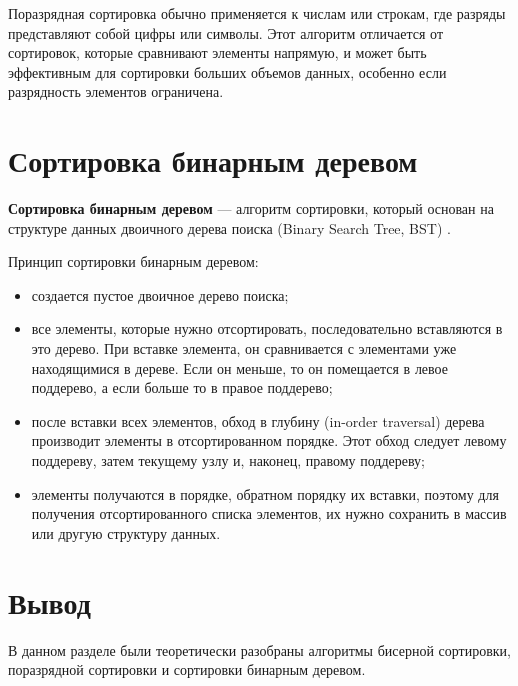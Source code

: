 Поразрядная сортировка обычно применяется к числам или строкам, где разряды представляют собой цифры или символы. Этот алгоритм отличается от сортировок, которые сравнивают элементы напрямую, и может быть эффективным для сортировки больших объемов данных, особенно если разрядность элементов ограничена.

\section{Сортировка бинарным деревом}
\textbf{Сортировка бинарным деревом} --- алгоритм сортировки, который основан на структуре данных двоичного дерева поиска (Binary Search Tree, BST) \cite{treesort}.

Принцип сортировки бинарным деревом:
\begin{itemize}
	\item создается пустое двоичное дерево поиска;
	\item все элементы, которые нужно отсортировать, последовательно вставляются в это дерево. При вставке элемента, он сравнивается с элементами уже находящимися в дереве. Если он меньше, то он помещается в левое поддерево, а если больше то в правое поддерево;
	\item после вставки всех элементов, обход в глубину (in-order traversal) дерева производит элементы в отсортированном порядке. Этот обход следует левому поддереву, затем текущему узлу и, наконец, правому поддереву;
	\item элементы получаются в порядке, обратном порядку их вставки, поэтому для получения отсортированного списка элементов, их нужно сохранить в массив или другую структуру данных.
\end{itemize}

\section*{Вывод}
В данном разделе были теоретически разобраны алгоритмы бисерной сортировки, поразрядной сортировки и сортировки бинарным деревом.
